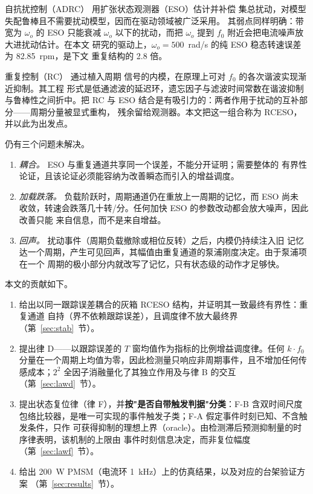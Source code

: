 \documentclass[journal]{IEEEtran}
\theoremstyle{remark}
\begin{document}
自抗扰控制（ADRC）\cite{han2009,gao2003} 用扩张状态观测器（ESO）估计并补偿
集总扰动，对模型失配鲁棒且不需要扰动模型，因而在驱动领域被广泛采用\cite{han2009}。
其弱点同样明确：带宽为 $\omega_o$ 的 ESO 只能衰减 $\omega_o$ 以下的扰动，而把
$\omega_o$ 提到 $f_0$ 附近会把电流噪声放大进扰动估计\cite{chen2016}。在本文
研究的驱动上，$\omega_o=500$~rad/s 的纯 ESO 稳态转速误差为 82.85~rpm，是下文
重复结构的 2.8 倍。

重复控制（RC）\cite{inoue1981,hara1988,tomizuka1988,longman2000} 通过植入周期
信号的内模\cite{francis1976}，在原理上可对 $f_0$ 的各次谐波实现渐近抑制。其工程
形式是低通滤波的延迟环，遗忘因子与滤波时间常数在谐波抑制与鲁棒性之间折中。把
RC 与 ESO 结合是有吸引力的：两者作用于扰动的互补部分——周期分量被显式重构，
残余留给观测器。本文把这一组合称为 RCESO，并以此为出发点。

仍有三个问题未解决。
\begin{enumerate}
\item \emph{耦合。} ESO 与重复通道共享同一个误差，不能分开证明；需要整体的
有界性论证，且该论证必须能容纳为改善瞬态而引入的增益调度。
\item \emph{加载跌落。} 负载阶跃时，周期通道仍在重放上一周期的记忆，而 ESO 尚未
收敛，转速会跌落几十转/分。任何加快 ESO 的参数改动都会放大噪声，因此改善只能
来自信息，而不是来自增益。
\item \emph{回声。} 扰动事件（周期负载撤除或相位反转）之后，内模仍持续注入旧
记忆达一个周期，产生可见回声，其幅值由重复通道的泵浦刚度决定。由于泵浦项在一个
周期的极小部分内就改写了记忆，只有状态级的动作才足够快。
\end{enumerate}

本文的贡献如下。
\begin{enumerate}
\item 给出以同一跟踪误差耦合的灰箱 RCESO 结构，并证明其一致最终有界性：重复通道
自持（界不依赖跟踪误差），且调度律不放大最终界（第~\ref{sec:stab}~节）。
\item 提出律 D——以跟踪误差的 $T$ 窗均值作为指标的比例增益调度律。任何 $k\cdot f_0$
分量在一个周期上均值为零，因此检测量只响应非周期事件，且不增加任何传感成本；$2^2$
全因子消融量化了其独立作用及与律 B 的交互（第~\ref{sec:lawd}~节）。
\item 提出状态复位律（律 F），并\textbf{按"是否自带触发判据"分类}：F-B 含双时间尺度
包络比较器，是唯一可实现的事件触发子类；F-A 假定事件时刻已知、不含触发条件，只作
可获得抑制的理想上界（oracle）。由检测滞后预测抑制量的时序律表明，该机制的上限由
事件时刻信息决定，而非复位幅度（第~\ref{sec:lawf}~节）。
\item 给出 200~W PMSM（电流环 1~kHz）上的仿真结果，以及对应的台架验证方案
（第~\ref{sec:results}~节）。
\end{enumerate}
\end{document}
